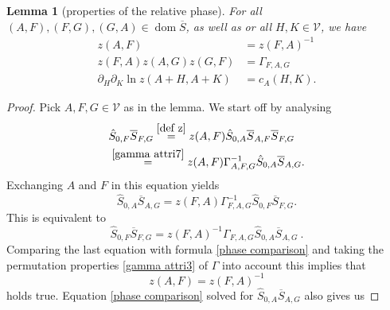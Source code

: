 \documentclass[b5paper,draft,openbib,12pt]{memoir}
\newtheorem{Lemma}[Def]{Lemma}
\DeclareMathOperator{\dom}{dom}
\begin{document}
\begin{Lemma}[properties of the relative phase]
For all \\
\((A,F),(F,G),(G,A)\in\dom\overline{S}\), as well as 
or all \(H,K\in \mathcal{V}\), we have
\begin{align}\label{z antisym}
z(A,F)&=z(F,A)^{-1}\\\label{z gamma}
z(F,A)z(A,G)z(G,F)&=\Gamma_{F,A,G}\\\label{z c}
\partial_{H}\partial_{K}\ln  z(A+ H,A+ K)&=c_A(H,K).
\end{align}
\end{Lemma}
\begin{proof}
Pick \(A,F,G\in\mathcal{V}\) as in the lemma. We start off by analysing
\begin{align}
&\hat{S}_{0,F}\overline{S}_{F,G}\overset{\eqref{def z}}{=}z(A,F)\hat{S}_{0,A}\overline{S}_{A,F}\overline{S}_{F,G}\\\label{phase comparison}
&\overset{\eqref{gamma attri7}}{=}z(A,F) \Gamma_{A,F,G}^{-1} \hat{S}_{0,A} \overline{S}_{A,G}.
\end{align}
Exchanging  \(A\) and \(F\) in this equation yields
\begin{equation}
\hat{S}_{0,A}\overline{S}_{A,G}=z(F,A) \Gamma_{F,A,G}^{-1} \hat{S}_{0,F} \overline{S}_{F,G}.
\end{equation}
This is equivalent to
\begin{equation}
\hat{S}_{0,F} \overline{S}_{F,G}=z(F,A)^{-1} \Gamma_{F,A,G} \hat{S}_{0,A}\overline{S}_{A,G}~.
\end{equation}
Comparing the last equation with 
formula \eqref{phase comparison} 
and taking the permutation properties 
 \eqref{gamma attri3} of \(\Gamma\) into 
 account this implies that 
\begin{equation}
z(A,F)=z(F,A)^{-1}
\end{equation}
holds true. Equation \eqref{phase comparison} solved for \(\hat{S}_{0,A}\overline{S}_{A,G}\) also gives us


\end{proof}
\end{document}
